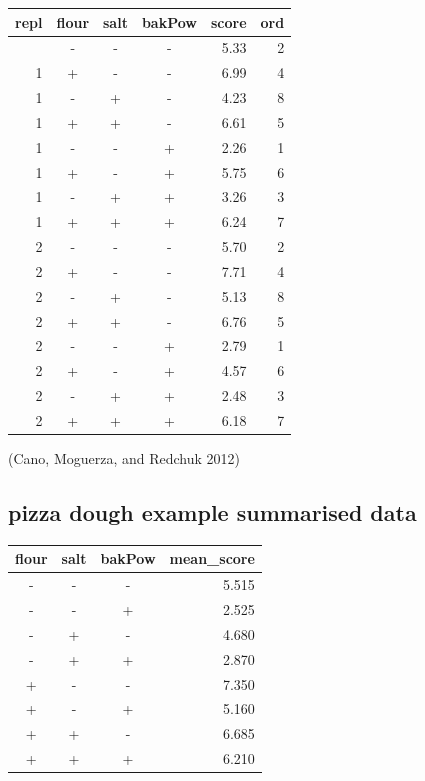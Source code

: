 \documentclass[
  a4paper,
]{scrbook}
\begin{document}
\begingroup
\fontsize{12.0pt}{14.4pt}\selectfont
\begin{longtable*}{rcccrr}
\toprule
repl & flour & salt & bakPow & score & ord \\ 
\midrule{} & - & - & - & 5.33 & 2 \\ 
1 & + & - & - & 6.99 & 4 \\ 
1 & - & + & - & 4.23 & 8 \\ 
1 & + & + & - & 6.61 & 5 \\ 
1 & - & - & + & 2.26 & 1 \\ 
1 & + & - & + & 5.75 & 6 \\ 
1 & - & + & + & 3.26 & 3 \\ 
1 & + & + & + & 6.24 & 7 \\ 
2 & - & - & - & 5.70 & 2 \\ 
2 & + & - & - & 7.71 & 4 \\ 
2 & - & + & - & 5.13 & 8 \\ 
2 & + & + & - & 6.76 & 5 \\ 
2 & - & - & + & 2.79 & 1 \\ 
2 & + & - & + & 4.57 & 6 \\ 
2 & - & + & + & 2.48 & 3 \\ 
2 & + & + & + & 6.18 & 7 \\ 
\bottomrule
\end{longtable*}
\endgroup

(Cano, Moguerza, and Redchuk 2012)

\subsection{pizza dough example summarised
data}\label{pizza-dough-example-summarised-data}

\begingroup
\fontsize{12.0pt}{14.4pt}\selectfont
\begin{longtable*}{cccr}
\toprule
flour & salt & bakPow & mean\_score \\ 
\midrule\addlinespace[2.5pt]
- & - & - & 5.515 \\ 
- & - & + & 2.525 \\ 
- & + & - & 4.680 \\ 
- & + & + & 2.870 \\ 
+ & - & - & 7.350 \\ 
+ & - & + & 5.160 \\ 
+ & + & - & 6.685 \\ 
+ & + & + & 6.210 \\ 
\bottomrule
\end{longtable*}
\endgroup
\end{document}
